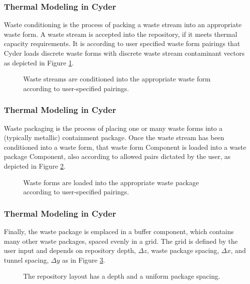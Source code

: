 \begin{frame}[ctb!]
\frametitle{Thermal Modeling in Cyder}
\footnotesize{

Waste conditioning is the process of packing a waste stream into an appropriate 
waste form. A waste stream is accepted into the repository, if it meets thermal capacity requirements. 
It is according to user specified waste form  
pairings that Cyder loads discrete waste forms with discrete waste 
stream contaminant vectors as depicted in Figure \ref{fig:ws_conditioning}.

\begin{figure}[htbp!]
\begin{center}
\def\svgwidth{.5\textwidth}

\end{center}
\caption{Waste streams are conditioned into the appropriate waste form 
according to user-specified pairings.}
\label{fig:ws_conditioning}
\end{figure}

  }
\end{frame}

\begin{frame}[ctb!]
\frametitle{Thermal Modeling in Cyder}
\footnotesize{


Waste packaging is the process of placing one or many waste forms into a 
(typically metallic) containment package. Once the waste stream has been 
conditioned into a waste form, that waste form Component is loaded into a waste 
package Component, also according to allowed pairs dictated by the user, as 
depicted in Figure \ref{fig:wf_packaging}.

\begin{figure}[htbp!]
\begin{center}
\def\svgwidth{.5\textwidth}

\end{center}
\caption{Waste forms are loaded into the appropriate waste package 
according to user-specified pairings.}
\label{fig:wf_packaging}
\end{figure}
  }
\end{frame}

\begin{frame}[ctb!]
\frametitle{Thermal Modeling in Cyder}
\footnotesize{

Finally, the waste package is emplaced in a buffer component, which 
contains many other waste packages, spaced evenly in a grid. The grid is 
defined by the user input and depends on repository depth, $\Delta z$, waste 
package spacing, $\Delta x$, and tunnel spacing, $\Delta y$ as in Figure 
\ref{fig:repo_layout}.

\begin{figure}[htbp!]
\begin{center}
\def\svgwidth{.5\textwidth}

\end{center}
\caption{The repository layout has a depth and a uniform package spacing.}
\label{fig:repo_layout}
\end{figure}

  }
\end{frame}
